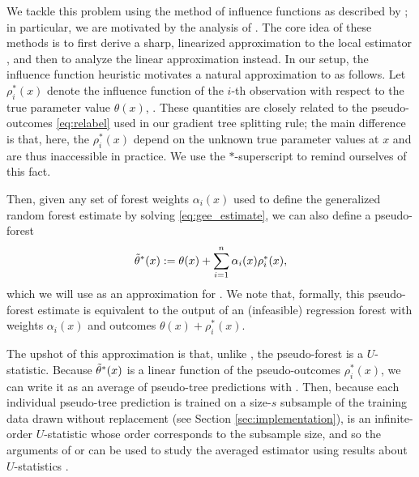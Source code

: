 \documentclass[aos]{imsart}
\theoremstyle{plain}
\theoremstyle{definition}
\theoremstyle{remark}
\begin{document}
\begin{CJK}{UTF8}{gbsn}
We tackle this problem using the method of influence functions as described by \citet{hampel1974influence};
in particular, we are motivated by the analysis of \citet{newey1994kernel}. The core idea of these methods
is to first derive a sharp, linearized approximation to the local estimator , and
then to analyze the linear approximation instead.
In our setup, the influence function heuristic motivates a natural approximation 
to  as follows. Let $\rho_i^*(x)$ denote the influence function of the
$i$-th observation with respect to the true parameter value $\theta(x)$,
.
These quantities are closely related to the pseudo-outcomes \eqref{eq:relabel} used in our gradient tree
splitting rule; the main difference is that, here, the $\rho_i^*(x)$ depend on the unknown true
parameter values at $x$ and are thus inaccessible in practice. We use the $*$-superscript to remind ourselves
of this fact.

Then, given any set of forest weights $\alpha_i(x)$ used to define the generalized random forest
estimate  by solving \eqref{eq:gee_estimate}, we can also define a
pseudo-forest
\begin{equation}
\label{eq:pseudo_forest}
\ttheta^*(x) := \theta(x) + \sum_{i = 1}^n \alpha_i(x) \rho_i^*(x),
\end{equation}
which we will use as an approximation for  . We note that,
formally, this pseudo-forest estimate  is equivalent to the output of an (infeasible)
regression forest with weights $\alpha_i(x)$ and outcomes $\theta(x) + \rho_i^*(x)$.

The upshot of this approximation is that, unlike , the pseudo-forest
 is a $U$-statistic.
Because $\tilde{\theta}^*(x)$ is a linear function of the pseudo-outcomes $\rho_i^*(x)$,
we can write it as an average of pseudo-tree predictions
 with
.
Then, because each individual pseudo-tree prediction  is trained on a size-$s$ subsample
of the training data drawn without replacement (see Section \ref{sec:implementation}), 
 is an infinite-order $U$-statistic whose order corresponds to the subsample size,
and so the arguments of \citet{mentch2016quantifying} or \citet{wager2015estimation} can be used to study the averaged estimator
 using results about $U$-statistics \citep{hoeffding1948class,efron1981jackknife}.


\end{CJK}
\end{document}
